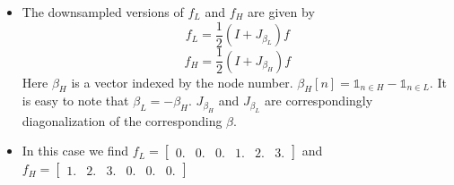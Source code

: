 \documentclass{article}
\begin{document}
\begin{itemize}
\item The downsampled versions of $f_L$ and $f_H$ are given by
 $$f_L = \frac{1}{2} (I + J_{\beta_L}) f$$
 $$f_H = \frac{1}{2}(I + J_{\beta_H}) f$$
Here $\beta_H$ is a vector indexed by the node number. $\beta_H[n] = \mathbb{1}_{n \in H} - \mathbb{1}_{n \in L}$. It is easy to note that $\beta_L = - \beta_H$. $J_{\beta_H}$ and $J_{\beta_L}$ are correspondingly diagonalization of the corresponding $\beta$.

\item In this case we find $f_L =
  \begin{bmatrix}
    0. & 0. & 0. & 1. & 2. & 3.
  \end{bmatrix}$
  and
  $f_H =
  \begin{bmatrix}
    1. & 2. & 3. & 0. & 0. & 0.
  \end{bmatrix}$


\end{itemize}
\end{document}
